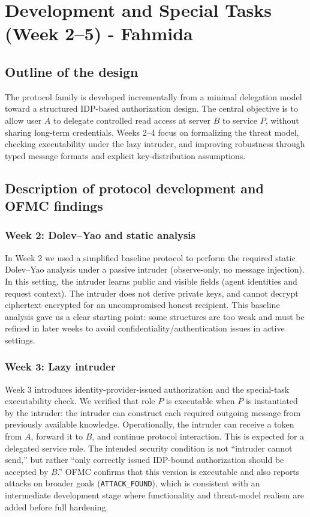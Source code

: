 \section{Development and Special Tasks (Week 2--5) - Fahmida}

\subsection{Outline of the design}

The protocol family is developed incrementally from a minimal delegation model toward a structured IDP-based authorization design.
The central objective is to allow user $A$ to delegate controlled read access at server $B$ to service $P$, without sharing long-term credentials.
Weeks 2--4 focus on formalizing the threat model, checking executability under the lazy intruder, and improving robustness through typed message formats and explicit key-distribution assumptions.

\subsection{Description of protocol development and OFMC findings}

\subsubsection{Week 2: Dolev--Yao and static analysis}

In Week 2 we used a simplified baseline protocol to perform the required static Dolev--Yao analysis under a passive intruder (observe-only, no message injection).
In this setting, the intruder learns public and visible fields (agent identities and request context).
The intruder does not derive private keys, and cannot decrypt ciphertext encrypted for an uncompromised honest recipient.
This baseline analysis gave us a clear starting point: some structures are too weak and must be refined in later weeks to avoid confidentiality/authentication issues in active settings.

\subsubsection{Week 3: Lazy intruder}

Week 3 introduces identity-provider-issued authorization and the special-task executability check.
We verified that role $P$ is executable when $P$ is instantiated by the intruder:
the intruder can construct each required outgoing message from previously available knowledge.
Operationally, the intruder can receive a token from $A$, forward it to $B$, and continue protocol interaction.
This is expected for a delegated service role.
The intended security condition is not ``intruder cannot send,'' but rather ``only correctly issued IDP-bound authorization should be accepted by $B$.'' 
OFMC confirms that this version is executable and also reports attacks on broader goals (\texttt{ATTACK\_FOUND}),
which is consistent with an intermediate development stage where functionality and threat-model realism are added before full hardening.

